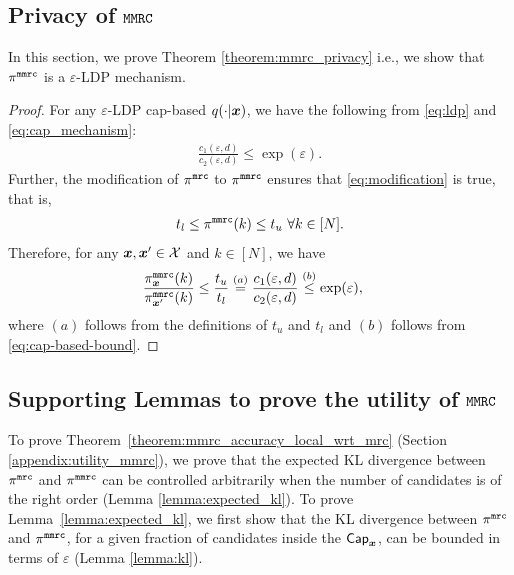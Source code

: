 \subsection{Privacy of \texorpdfstring{$\texttt{MMRC}$}{MMRC}}\label{appendix:privacy_mmrc}
In this section, we prove Theorem \ref{theorem:mmrc_privacy} i.e., we show that $\pi^{\texttt{mmrc}}$ is a $\varepsilon$-LDP mechanism.

\mmrcprivacy*
\begin{proof}
For any $\varepsilon$-LDP cap-based $q(\cdot | {\boldsymbol{x}})$, we have the following from \eqref{eq:ldp} and \eqref{eq:cap_mechanism}:
\begin{align}
 \frac{c_1(\varepsilon,d)}{c_2(\varepsilon,d)} \leq \exp(\varepsilon). \label{eq:cap-based-bound}
\end{align}
Further, the modification of $\pi^{\texttt{mrc}}$ to $\pi^{\texttt{mmrc}}$ ensures that \eqref{eq:modification} is true, that is,
\begin{align}
    t_l \leq \pi^{\texttt{mmrc}}(k) \leq t_u ~ \forall k \in [N].
\end{align}
Therefore, for any ${\boldsymbol{x}}, {\boldsymbol{x}}' \in \mathcal{X}$ and $k \in [N]$, we have
\begin{align}
    \frac{\pi^{\texttt{mmrc}}_{{\boldsymbol{x}}}(k)}{\pi^{\texttt{mmrc}}_{{\boldsymbol{x}}'}(k)} & \leq \frac{t_u}{t_l} \stackrel{(a)}{=} \frac{c_1(\varepsilon,d)}{c_2(\varepsilon,d)} \stackrel{(b)}{\leq} \exp(\varepsilon),
\end{align}
where $(a)$ follows from the definitions of $t_u$ and $t_l$ and $(b)$ follows from \eqref{eq:cap-based-bound}.
\end{proof}

\subsection{Supporting Lemmas to prove the utility of \texorpdfstring{$\texttt{MMRC}$}{MMRC}}
\label{appendix:supporting_lemma_mmrc_utility}

To prove Theorem~\ref{theorem:mmrc_accuracy_local_wrt_mrc} (Section \ref{appendix:utility_mmrc}), we prove that the expected KL divergence between $\pi^{\texttt{mrc}}$ and $\pi^{\texttt{mmrc}}$ can be controlled arbitrarily when the number of candidates is of the right order (Lemma \ref{lemma:expected_kl}).
To prove Lemma~\ref{lemma:expected_kl}, we first show that the KL divergence between $\pi^{\texttt{mrc}}$ and $\pi^{\texttt{mmrc}}$, for a given fraction of candidates inside the $\mathsf{Cap}_{{\boldsymbol{x}}}$, can be bounded in terms of $\varepsilon$ (Lemma \ref{lemma:kl}).

